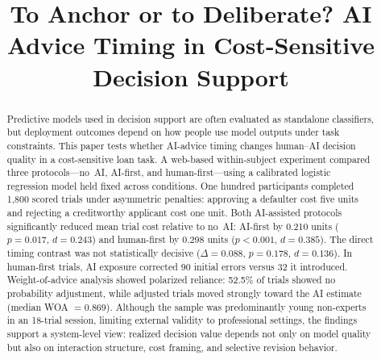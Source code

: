 \documentclass[conference]{IEEEtran}
\newcommand{\tighttables}{%
  \setlength{\textfloatsep}{9pt plus 2pt minus 2pt}%
  \setlength{\floatsep}{8pt plus 2pt minus 2pt}%
  \setlength{\intextsep}{8pt plus 2pt minus 2pt}%
}
\begin{document}
\tighttables

\title{To Anchor or to Deliberate? AI Advice Timing in
       Cost-Sensitive Decision Support}

\author{%
  \and
}

\maketitle


\begin{abstract}
Predictive models used in decision support are often evaluated as
standalone classifiers, but deployment outcomes depend on how people use
model outputs under task constraints. This paper tests whether AI-advice
timing changes human--AI decision quality in a cost-sensitive loan task.
A web-based within-subject experiment compared three protocols---no~AI,
AI-first, and human-first---using a calibrated logistic regression model
held fixed across conditions. One hundred participants completed 1,800
scored trials under asymmetric penalties: approving a defaulter cost five
units and rejecting a creditworthy applicant cost one unit. Both
AI-assisted protocols significantly reduced mean trial cost relative to
no~AI: AI-first by 0.210 units ($p = 0.017$, $d = 0.243$) and
human-first by 0.298 units ($p < 0.001$, $d = 0.385$). The direct timing
contrast was not statistically decisive ($\Delta = 0.088$, $p = 0.178$,
$d = 0.136$). In human-first trials, AI exposure corrected 90 initial
errors versus 32 it introduced. Weight-of-advice analysis showed
polarized reliance: 52.5\% of trials showed no probability adjustment,
while adjusted trials moved strongly toward the AI estimate (median WOA
$= 0.869$). Although the sample was predominantly young non-experts in
an 18-trial session, limiting external validity to professional settings,
the findings support a system-level view: realized decision value depends
not only on model quality but also on interaction structure, cost
framing, and selective revision behavior.
\end{abstract}
\end{document}
